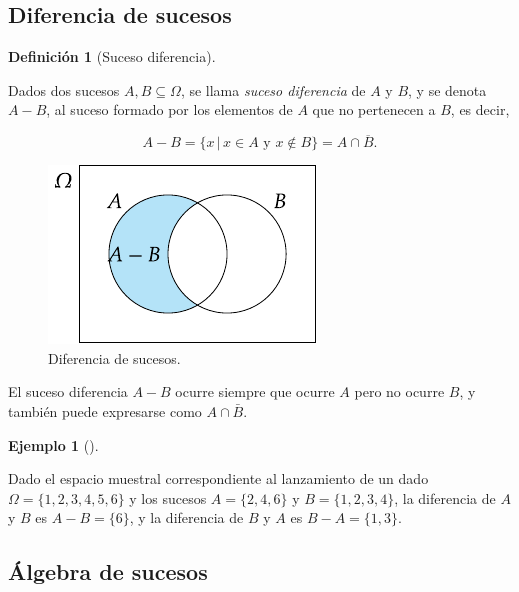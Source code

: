 \documentclass[
  a4paper,
]{scrreport}
\theoremstyle{plain}
\theoremstyle{definition}
\newtheorem{example}{Ejemplo}[chapter]
\theoremstyle{definition}
\newtheorem{definition}{Definición}[chapter]
\theoremstyle{remark}
\begin{document}
\subsection{Diferencia de sucesos}\label{diferencia-de-sucesos}

\begin{definition}[Suceso
diferencia]\protect\hypertarget{def-diferencia-sucesos}{}\label{def-diferencia-sucesos}

Dados dos sucesos \(A,B\subseteq \Omega\), se llama \emph{suceso
diferencia} de \(A\) y \(B\), y se denota \(A-B\), al suceso formado por
los elementos de \(A\) que no pertenecen a \(B\), es decir,

\[A-B = \{x\,|\, x\in A\mbox{ y }x\not\in B\} = A \cap \overline B.\]

\end{definition}

\begin{figure}[H]

{\centering \includegraphics{img/probabilidad/diferencia.pdf}

}

\caption{Diferencia de sucesos.}

\end{figure}%

El suceso diferencia \(A-B\) ocurre siempre que ocurre \(A\) pero no
ocurre \(B\), y también puede expresarse como \(A\cap \bar B\).

\begin{example}[]\protect\hypertarget{exm-diferencia-sucesos}{}\label{exm-diferencia-sucesos}

Dado el espacio muestral correspondiente al lanzamiento de un dado
\(\Omega=\{1,2,3,4,5,6\}\) y los sucesos \(A=\{2,4,6\}\) y
\(B=\{1,2,3,4\}\), la diferencia de \(A\) y \(B\) es \(A-B=\{6\}\), y la
diferencia de \(B\) y \(A\) es \(B-A=\{1,3\}\).

\end{example}

\subsection{Álgebra de sucesos}\label{uxe1lgebra-de-sucesos}
\end{document}
